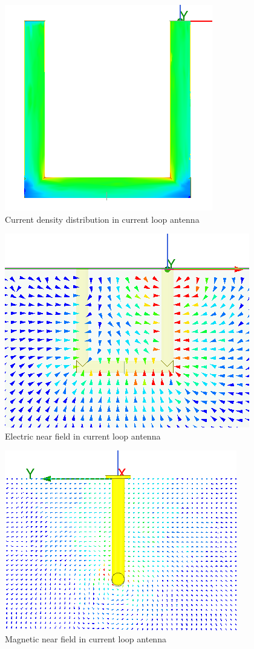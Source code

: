 \begin{figure}[h]
	\centering
	\includegraphics[width=0.5\linewidth]{content/30_simulations/img/current_loop_current_distribution}
	\caption{Current density distribution in current loop antenna}
	\label{fig:currentloopcurrentdistribution}
\end{figure}

\begin{figure}[h]
	\centering
	\includegraphics[width=0.7\linewidth]{content/30_simulations/img/current_loop_near_e_field}
	\caption{Electric near field in current loop antenna}
	\label{fig:currentloopnearefield}
\end{figure}

\begin{figure}[h]
	\centering
	\includegraphics[width=0.7\linewidth]{content/30_simulations/img/current_loop_near_h_field}
	\caption{Magnetic near field in current loop antenna}
	\label{fig:currentloopnearhfield}
\end{figure}

